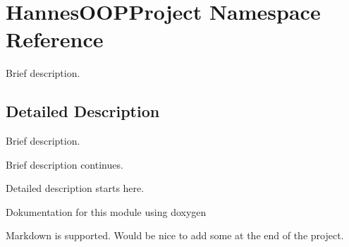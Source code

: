 \hypertarget{namespace_hannes_o_o_p_project}{}\section{Hannes\+O\+O\+P\+Project Namespace Reference}
\label{namespace_hannes_o_o_p_project}


Brief description.  




\subsection{Detailed Description}
Brief description. 

Brief description continues.

Detailed description starts here.

Dokumentation for this module using doxygen

Markdown is supported. Would be nice to add some at the end of the project. 